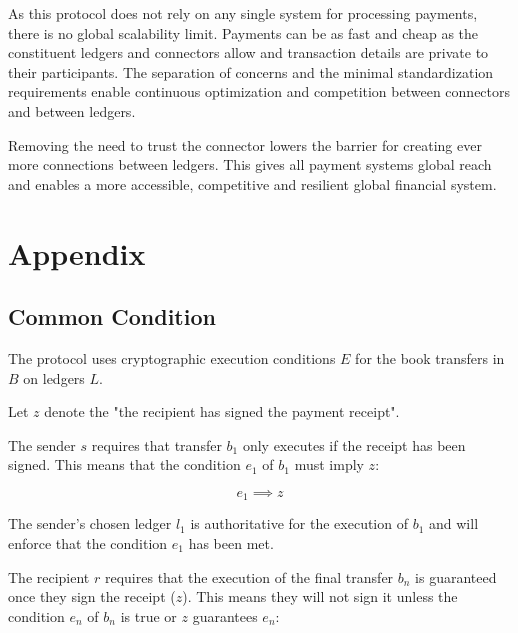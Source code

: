 \documentclass[letterpaper,twocolumn,10pt]{article}
\begin{document}
As this protocol does not rely on any single system for processing payments, there is no global scalability limit. Payments can be as fast and cheap as the constituent ledgers and connectors allow and transaction details are private to their participants. The separation of concerns and the minimal standardization requirements enable continuous optimization and competition between connectors and between ledgers.

Removing the need to trust the connector lowers the barrier for creating ever more connections between ledgers. This gives all payment systems global reach and enables a more accessible, competitive and resilient global financial system.



{\footnotesize 
}

\clearpage
\appendix
\section{Appendix}
\subsection{Common Condition}
\label{subsec:common-condition}


The protocol uses cryptographic execution conditions $E$ for the book transfers in $B$ on ledgers $L$.

Let $z$ denote the "the recipient has signed the payment receipt".

The sender $s$ requires that transfer $b_1$ only executes if the receipt has been signed. This means that the condition $e_1$ of $b_1$ must imply $z$:

\begin{equation}
e_1 \implies z \label{eq:axiomsender}
\end{equation}

The sender's chosen ledger $l_1$ is authoritative for the execution of $b_1$ and will enforce that the condition $e_1$ has been met.

The recipient $r$ requires that the execution of the final transfer $b_n$ is guaranteed once they sign the receipt ($z$). This means they will not sign it unless the condition $e_n$ of $b_n$ is true or $z$ guarantees $e_n$:
\end{document}
